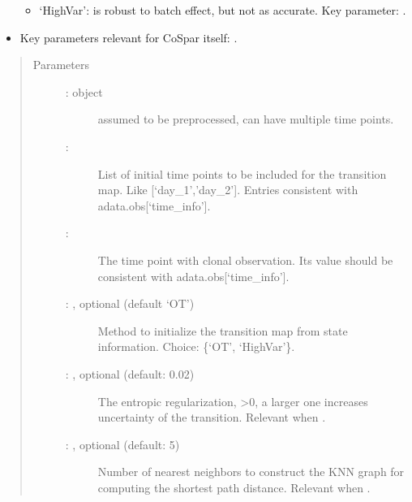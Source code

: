 \documentclass[letterpaper,10pt,english]{sphinxmanual}
\begin{document}
\begin{fulllineitems}
\begin{itemize}
\begin{itemize}
\item {} 
‘HighVar’:  is robust to batch effect, but not as accurate.
Key parameter: .

\end{itemize}

\item {} 
Key parameters relevant for CoSpar itself: .

\end{itemize}
\begin{quote}\begin{description}
\item[{Parameters}] \leavevmode\begin{description}
\item[{ :  object}] \leavevmode
assumed to be preprocessed, can have multiple time points.

\item[{ : }] \leavevmode
List of initial time points to be included for the transition map.
Like {[}‘day\_1’,’day\_2’{]}. Entries consistent with adata.obs{[}‘time\_info’{]}.

\item[{ : }] \leavevmode
The time point with clonal observation. Its value should be
consistent with adata.obs{[}‘time\_info’{]}.

\item[{ : , optional (default ‘OT’)}] \leavevmode
Method to initialize the transition map from state information.
Choice: \{‘OT’, ‘HighVar’\}.

\item[{ : , optional (default: 0.02)}] \leavevmode
The entropic regularization, \textgreater{}0, a larger one increases
uncertainty of the transition. Relevant when .

\item[{ : , optional (default: 5)}] \leavevmode
Number of nearest neighbors to construct the KNN graph for
computing the shortest path distance. Relevant when .


\end{description}
\end{description}
\end{quote}
\end{fulllineitems}
\end{document}
